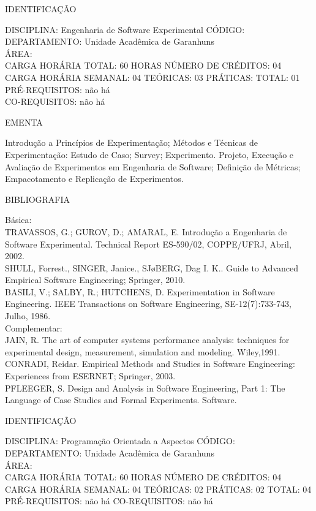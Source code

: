 \documentclass[
	12pt,				%
	openright,			%
  oneside,     %
	a4paper,			%
	chapter=TITLE,		%
	english,			%
	french,				%
	spanish,			%
	brazil				%
	]{abntex2}
\begin{document}
\begin{apendicesenv}
IDENTIFICAÇÃO

DISCIPLINA: Engenharia de Software Experimental CÓDIGO:\\ 
DEPARTAMENTO: Unidade Acadêmica de Garanhuns\\
ÁREA: \\
CARGA HORÁRIA TOTAL: 60 HORAS NÚMERO DE CRÉDITOS: 04\\
CARGA HORÁRIA SEMANAL: 04 TEÓRICAS: 03 PRÁTICAS: TOTAL: 01\\
PRÉ-REQUISITOS: não há\\
CO-REQUISITOS: não há

EMENTA 

Introdução a Princípios de Experimentação; Métodos e Técnicas de
Experimentação: Estudo de Caso; Survey; Experimento. Projeto, Execução
e Avaliação de Experimentos em Engenharia de Software; Definição de
Métricas; Empacotamento e Replicação de Experimentos.

BIBLIOGRAFIA 

Básica:\\
TRAVASSOS, G.; GUROV, D.; AMARAL, E. Introdução a Engenharia de Software
Experimental. Technical Report ES-590/02, COPPE/UFRJ, Abril, 2002.\\
SHULL, Forrest., SINGER, Janice., SJøBERG, Dag I. K.. Guide to Advanced
Empirical Software Engineering; Springer, 2010.\\
BASILI, V.; SALBY, R.; HUTCHENS, D. Experimentation in Software
Engineering. IEEE Transactions on Software Engineering,
SE-12(7):733-743, Julho, 1986.\\
Complementar:\\
JAIN, R. The art of computer systems performance analysis: techniques
for experimental design, measurement, simulation and modeling.
Wiley,1991.\\
CONRADI, Reidar. Empirical Methods and Studies in Software Engineering:
Experiences from ESERNET; Springer, 2003.\\
PFLEEGER, S. Design and Analysis in Software Engineering, Part 1: The
Language of Case Studies and Formal Experiments. Software.

\newpage IDENTIFICAÇÃO

DISCIPLINA: Programação Orientada a Aspectos CÓDIGO:\\ 
DEPARTAMENTO: Unidade Acadêmica de Garanhuns\\ ÁREA: \\
CARGA HORÁRIA TOTAL: 60 HORAS NÚMERO DE CRÉDITOS: 04\\
CARGA HORÁRIA SEMANAL: 04 TEÓRICAS: 02 PRÁTICAS: 02 TOTAL: 04\\
PRÉ-REQUISITOS: não há
CO-REQUISITOS: não há


\end{apendicesenv}
\end{document}
